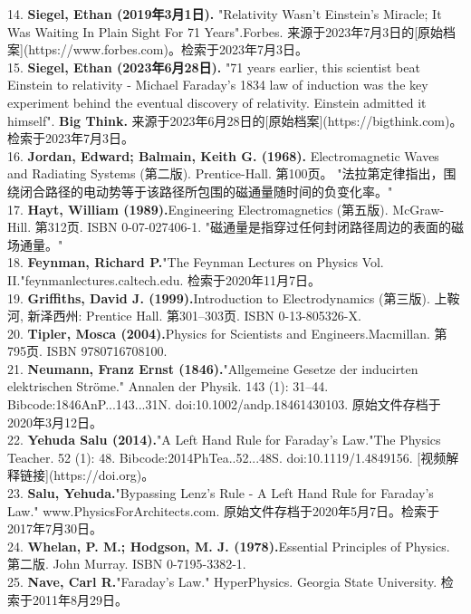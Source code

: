 14. \textbf{Siegel, Ethan (2019年3月1日).} "Relativity Wasn't Einstein's Miracle; It Was Waiting In Plain Sight For 71 Years".Forbes. 来源于2023年7月3日的[原始档案](https://www.forbes.com)。检索于2023年7月3日。\\
15. \textbf{Siegel, Ethan (2023年6月28日).} "71 years earlier, this scientist beat Einstein to relativity - Michael Faraday's 1834 law of induction was the key experiment behind the eventual discovery of relativity. Einstein admitted it himself". \textbf{Big Think.} 来源于2023年6月28日的[原始档案](https://bigthink.com)。检索于2023年7月3日。\\
16. \textbf{Jordan, Edward; Balmain, Keith G. (1968).} Electromagnetic Waves and Radiating Systems (第二版). Prentice-Hall. 第100页。
"法拉第定律指出，围绕闭合路径的电动势等于该路径所包围的磁通量随时间的负变化率。" \\ 
17. \textbf{Hayt, William (1989).}Engineering Electromagnetics (第五版). McGraw-Hill. 第312页. ISBN 0-07-027406-1.  
"磁通量是指穿过任何封闭路径周边的表面的磁场通量。"\\
18. \textbf{Feynman, Richard P.}"The Feynman Lectures on Physics Vol. II."feynmanlectures.caltech.edu. 检索于2020年11月7日。\\
19. \textbf{Griffiths, David J. (1999).}Introduction to Electrodynamics (第三版). 上鞍河, 新泽西州: Prentice Hall. 第301–303页. ISBN 0-13-805326-X.\\ 
20. \textbf{Tipler, Mosca (2004).}Physics for Scientists and Engineers.Macmillan. 第795页. ISBN 9780716708100.\\
21. \textbf{Neumann, Franz Ernst (1846).}"Allgemeine Gesetze der inducirten elektrischen Ströme." Annalen der Physik. 143 (1): 31–44. Bibcode:1846AnP...143...31N. doi:10.1002/andp.18461430103. 原始文件存档于2020年3月12日。\\
22. \textbf{Yehuda Salu (2014).}"A Left Hand Rule for Faraday's Law."The Physics Teacher. 52 (1): 48. Bibcode:2014PhTea..52...48S. doi:10.1119/1.4849156. [视频解释链接](https://doi.org)。\\
23. \textbf{Salu, Yehuda.}"Bypassing Lenz's Rule - A Left Hand Rule for Faraday's Law." www.PhysicsForArchitects.com. 原始文件存档于2020年5月7日。检索于2017年7月30日。\\
24. \textbf{Whelan, P. M.; Hodgson, M. J. (1978).}Essential Principles of Physics. 第二版. John Murray. ISBN 0-7195-3382-1.\\
25. \textbf{Nave, Carl R.}"Faraday's Law." HyperPhysics. Georgia State University. 检索于2011年8月29日。\\
